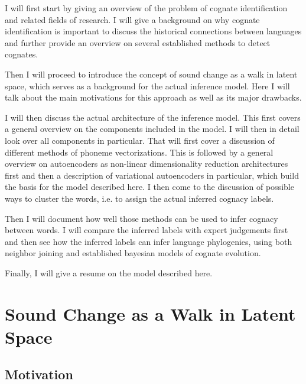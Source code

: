 \documentclass[8pt]{article}
\begin{document}
I will first start by giving an overview of the problem of cognate identification and related fields of research. I will give a background on why cognate identification is important to discuss the historical connections between languages and further provide an overview on several established methods to detect cognates.  

Then I will proceed to introduce the concept of sound change as a walk in latent space, which serves as a background for the actual inference model. Here I will talk about the main motivations for this approach as well as its major drawbacks. 


I will then discuss the actual architecture of the inference model. This first covers a general overview on the components included in the model. I will then in detail look over all components in particular. That will first cover a discussion of different methods of phoneme vectorizations. This is followed by a general overview on autoencoders as non-linear dimensionality reduction architectures first and then a description of variational autoencoders in particular, which build the basis for the model described here. I then come to the discussion of possible ways to cluster the words, i.e. to assign the actual inferred cognacy labels.

Then I will document how well those methods can be used to infer cognacy between words. I will compare the inferred labels with expert judgements first and then see how the inferred labels can infer language phylogenies, using both neighbor joining and established bayesian models of cognate evolution.

Finally, I will give a resume on the model described here.


\section{Sound Change as a Walk in Latent Space}
\label{Sound Change as a Walk in Latent Space}
\subsection{Motivation}
\end{document}
